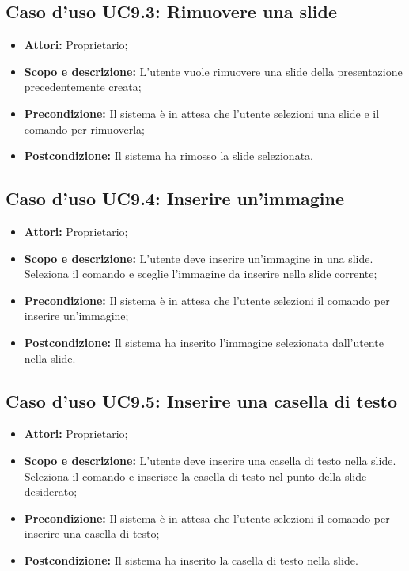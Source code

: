 \subsection{Caso d'uso UC9.3: Rimuovere una slide}
\begin{itemize}
	\item \textbf{Attori:} Proprietario;
	\item \textbf{Scopo e descrizione:} L'utente vuole rimuovere una slide della presentazione precedentemente creata;
	\item \textbf{Precondizione:} Il sistema è in attesa che l'utente selezioni una slide e il comando per rimuoverla;
	\item \textbf{Postcondizione:} Il sistema ha rimosso la slide selezionata.
\end{itemize}


\subsection{Caso d'uso UC9.4: Inserire un'immagine}
\begin{itemize}
\item \textbf{Attori:} Proprietario;
\item \textbf{Scopo e descrizione:} L'utente deve inserire un'immagine in una slide. Seleziona il comando e sceglie l'immagine da inserire nella slide corrente;
\item \textbf{Precondizione:} Il sistema è in attesa che l'utente selezioni il comando per inserire un'immagine;
\item \textbf{Postcondizione:} Il sistema ha inserito l'immagine selezionata dall'utente nella slide.
\end{itemize}


\subsection{Caso d'uso UC9.5: Inserire una casella di testo}
\begin{itemize}
\item \textbf{Attori:} Proprietario;
\item \textbf{Scopo e descrizione:} L'utente deve inserire una casella di testo nella slide. Seleziona il comando e inserisce la casella di testo nel punto della slide desiderato;
\item \textbf{Precondizione:} Il sistema è in attesa che l'utente selezioni il comando per inserire una casella di testo;
\item \textbf{Postcondizione:} Il sistema ha inserito la casella di testo nella slide.
\end{itemize}



